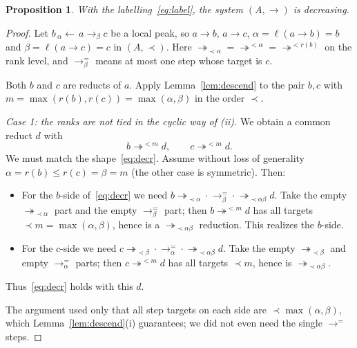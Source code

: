 \documentclass{amsart}
\newtheorem{proposition}{Proposition}
\theoremstyle{definition}
\theoremstyle{remark}
\newcommand{\redto}{\rightarrow}
\newcommand{\redtt}{\twoheadrightarrow}
\begin{document}
\begin{proposition}\label{prop:decr}
With the labelling~\eqref{eq:label}, the system $(A,\redto)$ is decreasing.
\end{proposition}

\begin{proof}
Let $b\,{}_\alpha{\leftarrow}\,a\redto_\beta c$ be a local peak, so $a\redto b$,
$a\redto c$, $\alpha=\ell(a\redto b)=b$ and $\beta=\ell(a\redto c)=c$ in
$(A,\prec)$.  Here $\redtt_{\prec\alpha}=\redtt^{<\alpha}=\redtt^{<r(b)}$ on the
rank level, and $\redto^{=}_\beta$ means at most one step whose target is $c$.

Both $b$ and $c$ are reducts of $a$.  Apply Lemma~\ref{lem:descend} to the pair
$b,c$ with $m=\max(r(b),r(c))=\max(\alpha,\beta)$ in the order $\prec$.

\emph{Case 1: the ranks are not tied in the cyclic way of (ii).}  We obtain a
common reduct $d$ with
\[
   b\redtt^{<m} d,\qquad c\redtt^{<m} d .
\]
We must match the shape~\eqref{eq:decr}.  Assume without loss of generality
$\alpha=r(b)\le r(c)=\beta=m$ (the other case is symmetric).  Then:
\begin{itemize}
\item For the $b$-side of~\eqref{eq:decr} we need
$b\redtt_{\prec\alpha}\cdot\redto^{=}_\beta\cdot\redtt_{\prec\alpha\beta}d$.
Take the empty $\redtt_{\prec\alpha}$ part and the empty $\redto^{=}_\beta$
part; then $b\redtt^{<m}d$ has all targets $\prec m=\max(\alpha,\beta)$, hence is
a $\redtt_{\prec\alpha\beta}$ reduction.  This realizes the $b$-side.
\item For the $c$-side we need
$c\redtt_{\prec\beta}\cdot\redto^{=}_\alpha\cdot\redtt_{\prec\alpha\beta}d$.
Take the empty $\redtt_{\prec\beta}$ and empty $\redto^{=}_\alpha$ parts; then
$c\redtt^{<m}d$ has all targets $\prec m$, hence is $\redtt_{\prec\alpha\beta}$.
\end{itemize}
Thus~\eqref{eq:decr} holds with this $d$.

The argument used only that all step targets on each side are $\prec
\max(\alpha,\beta)$, which Lemma~\ref{lem:descend}(i) guarantees; we did not
even need the single $\redto^{=}$ steps.


\end{proof}
\end{document}

